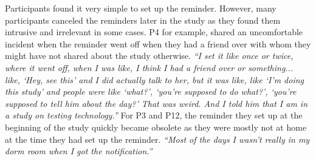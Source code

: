         Participants found it very simple to set up the reminder. However, many participants canceled the reminders later in the study as they found them intrusive and irrelevant in some cases.
        P4 for example, shared an uncomfortable incident when the reminder went off when they had a friend over with whom they might have not shared about the study otherwise.
                \textit{``I set it like once or twice, where it went off, when I was like, I think I had a friend over or something... like, `Hey, see this' and I did actually talk to her, but it was like, like `I'm doing this study' and people were like `what?', `you're supposed to do what?', `you're supposed to tell him about the day?' 
                That was weird. And I told him that I am in a study on testing technology.''}
        For P3 and P12, the reminder they set up at the beginning of the study quickly became obsolete as they were mostly not at home at the time they had set up the reminder.
                \textit{``Most of the days I wasn't really in my dorm room when I got the notification.''}
        
